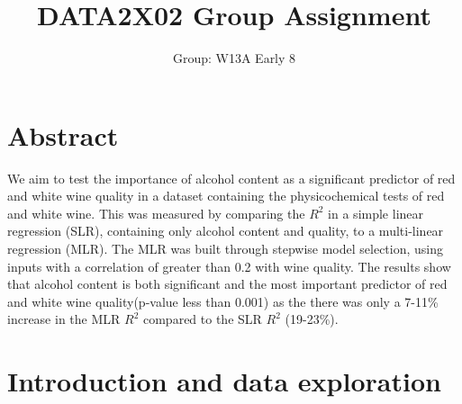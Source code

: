 \documentclass[letterpaper,11pt,twocolumn,twoside,]{pinp}
\title{DATA2X02 Group Assignment}
\author[a]{Group: W13A Early 8}
\begin{document}
\verticaladjustment{-2pt}

\maketitle
\thispagestyle{firststyle}




\vspace{-20truemm}

\hypertarget{abstract}{%
\section{Abstract}\label{abstract}}

We aim to test the importance of alcohol content as a significant
predictor of red and white wine quality in a dataset containing the
physicochemical tests of red and white wine. This was measured by
comparing the \(R^{2}\) in a simple linear regression (SLR), containing
only alcohol content and quality, to a multi-linear regression (MLR).
The MLR was built through stepwise model selection, using inputs with a
correlation of greater than 0.2 with wine quality. The results show that
alcohol content is both significant and the most important predictor of
red and white wine quality(p-value less than 0.001) as the there was
only a 7-11\% increase in the MLR \(R^{2}\) compared to the SLR
\(R^{2}\) (19-23\%).

\hypertarget{introduction-and-data-exploration}{%
\section{Introduction and data
exploration}\label{introduction-and-data-exploration}}
\end{document}
